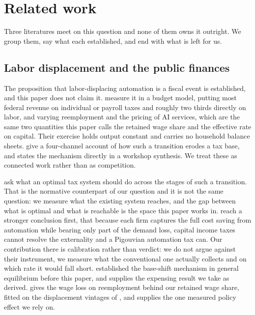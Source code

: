 \section{Related work}
\label{sec:related}

Three literatures meet on this question and none of them owns it outright. We group them, say
what each established, and end with what is left for us.

\subsection{Labor displacement and the public finances}

The proposition that labor-displacing automation is a fiscal event is established, and this
paper does not claim it. \citet{PriceSuresh2026} measure it in a budget model, putting most
federal revenue on individual or payroll taxes and roughly two thirds directly on labor, and
varying reemployment and the pricing of AI services, which are the same two quantities this paper
calls the retained wage share and the effective rate on capital. Their exercise holds output
constant and carries no household balance sheets. \citet{IeongSaputraManiarCheng2026} give a
four-channel account of how such a transition erodes a tax base, and \citet{Barhoumi2026} states
the mechanism directly in a workshop synthesis. We treat these as connected work rather than as
competition.

\citet{KorinekLockwood2026} ask what an optimal tax system should do across the stages of such a
transition. That is the normative counterpart of our question and it is not the same question: we
measure what the existing system reaches, and the gap between what is optimal and what is
reachable is the space this paper works in. \citet{FalkTsoukalas2026} reach a stronger conclusion
first, that because each firm captures the full cost saving from automation while bearing only
part of the demand loss, capital income taxes cannot resolve the externality and a Pigouvian
automation tax can. Our contribution there is calibration rather than verdict: we do not argue
against their instrument, we measure what the conventional one actually collects and on which
rate it would fall short.
\citet{CasasTorres2024} established the base-shift mechanism in general equilibrium before this
paper, and \citet{AcemogluManeraRestrepo2020} supplies the expensing result we take as derived.
\citet{Huckfeldt2022} gives the wage loss on reemployment behind our retained wage share, fitted
on the displacement vintages of \citet{BLSWorkerDisplacement}, and \citet{Brollo2024} supplies the
one measured policy effect we rely on.

